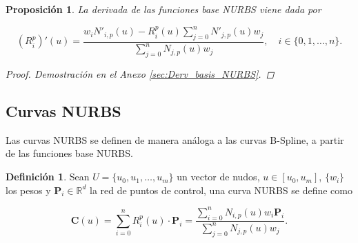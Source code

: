\documentclass[11pt]{book}
\theoremstyle{plain} %
\newtheorem{proposicion}[teorema]{Proposición}
\theoremstyle{definition} %
\newtheorem*{defin}{Definición} %
\theoremstyle{definition} %
\begin{document}
\vspace{-0.1cm}

\begin{proposicion}
    La derivada de las funciones base NURBS viene dada por
    
    \vspace{-0.15cm}
    
    $$(R_i^p)'(u) = \frac{w_i N'_{i,p}(u) - R_i^p(u) \sum_{j=0}^{n} N'_{j,p}(u) w_j}{\sum_{j=0}^{n} N_{j,p}(u) w_j},\quad i \in \{0,1, \dots , n\}.$$
    
    \vspace{-0.25cm}

    \begin{proof}
        Demostración en el Anexo \ref{sec:Derv_basis_NURBS}.
    \end{proof}
\end{proposicion}

\vspace{-0.8cm}

\subsection{Curvas NURBS}

\vspace{-0.2cm}

Las curvas NURBS se definen de manera análoga a las curvas B-Spline, a partir de las funciones base NURBS.%


\vspace{-0.15cm}

\begin{defin}
    Sean $U = \{u_0, u_1, \ldots, u_m\}$ un vector de nudos, $u \in [u_0, u_m]$, $\{w_i\}$ los pesos y $\mathbf{P}_i \in \mathbb{R}^d$ la red de puntos de control,
    una curva NURBS se define como

    \vspace{-0.25cm}

    \begin{equation}
        \label{eq:NURBS_Curve}
        \mathbf{C}(u) = \sum_{i=0}^{n} R_i^p(u) \cdot \mathbf{P}_i = \frac{\sum_{i=0}^{n} N_{i,p}(u) w_i \mathbf{P}_i}{\sum_{j=0}^{n} N_{j,p}(u) w_j}.
    \end{equation}

    \vspace{-0.4cm}

\end{defin}
\end{document}
